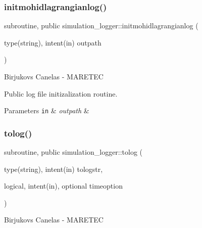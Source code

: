 \subsubsection{\texorpdfstring{initmohidlagrangianlog()}{initmohidlagrangianlog()}}
{\footnotesize\ttfamily subroutine, public simulation\+\_\+logger\+::initmohidlagrangianlog (\begin{DoxyParamCaption}\item[{type(string), intent(in)}]{outpath }\end{DoxyParamCaption})}



Birjukovs Canelas -\/ M\+A\+R\+E\+T\+EC 

Public log file initizalization routine. 
\begin{DoxyParams}[1]{Parameters}
\mbox{\tt in}  & {\em outpath} & \\
\hline
\end{DoxyParams}
\mbox{\label{namespacesimulation__logger_a3aaa69ec168b6f34d703fb4033a22d92}} 
\subsubsection{\texorpdfstring{tolog()}{tolog()}}
{\footnotesize\ttfamily subroutine, public simulation\+\_\+logger\+::tolog (\begin{DoxyParamCaption}\item[{type(string), intent(in)}]{tologstr,  }\item[{logical, intent(in), optional}]{timeoption }\end{DoxyParamCaption})}



Birjukovs Canelas -\/ M\+A\+R\+E\+T\+EC 

